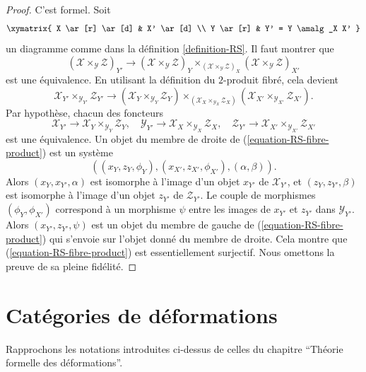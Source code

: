 \begin{proof}
C'est formel. Soit
$$
\xymatrix{
X \ar[r] \ar[d] & X' \ar[d] \\
Y \ar[r] & Y' = Y \amalg_X X'
}
$$
un diagramme comme dans la définition \ref{definition-RS}. Il faut montrer que
$$
(\mathcal{X} \times_{\mathcal{Y}} \mathcal{Z})_{Y'}
\longrightarrow
(\mathcal{X} \times_{\mathcal{Y}} \mathcal{Z})_Y
\times_{(\mathcal{X} \times_{\mathcal{Y}} \mathcal{Z})_X}
(\mathcal{X} \times_{\mathcal{Y}} \mathcal{Z})_{X'}
$$
est une équivalence. En utilisant la définition du $2$-produit fibré,
cela devient
\begin{equation}
\label{equation-RS-fibre-product}
\mathcal{X}_{Y'} \times_{\mathcal{Y}_{Y'}} \mathcal{Z}_{Y'}
\longrightarrow
(\mathcal{X}_Y \times_{\mathcal{Y}_Y} \mathcal{Z}_Y)
\times_{(\mathcal{X}_X \times_{\mathcal{Y}_X} \mathcal{Z}_X)}
(\mathcal{X}_{X'} \times_{\mathcal{Y}_{X'}} \mathcal{Z}_{X'}).
\end{equation}
Par hypothèse, chacun des foncteurs
$$
\mathcal{X}_{Y'} \to \mathcal{X}_Y \times_{\mathcal{Y}_Y} \mathcal{Z}_Y,
\quad
\mathcal{Y}_{Y'} \to \mathcal{X}_X \times_{\mathcal{Y}_X} \mathcal{Z}_X,
\quad
\mathcal{Z}_{Y'} \to
\mathcal{X}_{X'} \times_{\mathcal{Y}_{X'}} \mathcal{Z}_{X'}
$$
est une équivalence. Un objet du membre de droite de
(\ref{equation-RS-fibre-product}) est un système
$$
((x_Y, z_Y, \phi_Y), (x_{X'}, z_{X'}, \phi_{X'}), (\alpha, \beta)).
$$
Alors $(x_Y, x_{Y'}, \alpha)$ est isomorphe à l'image d'un objet
$x_{Y'}$ de $\mathcal{X}_{Y'}$, et $(z_Y, z_{Y'}, \beta)$ est isomorphe
à l'image d'un objet $z_{Y'}$ de $\mathcal{Z}_{Y'}$. Le couple de
morphismes $(\phi_Y, \phi_{X'})$ correspond à un morphisme $\psi$
entre les images de $x_{Y'}$ et $z_{Y'}$ dans $\mathcal{Y}_{Y'}$.
Alors $(x_{Y'}, z_{Y'}, \psi)$ est un objet du membre de gauche de
(\ref{equation-RS-fibre-product}) qui s'envoie sur l'objet donné du
membre de droite. Cela montre que (\ref{equation-RS-fibre-product}) est
essentiellement surjectif. Nous omettons la preuve de sa pleine fidélité.
\end{proof}





\section{Catégories de déformations}
\label{section-deformation-categories}

\noindent
Rapprochons les notations introduites ci-dessus de celles du
chapitre ``Théorie formelle des déformations''.

